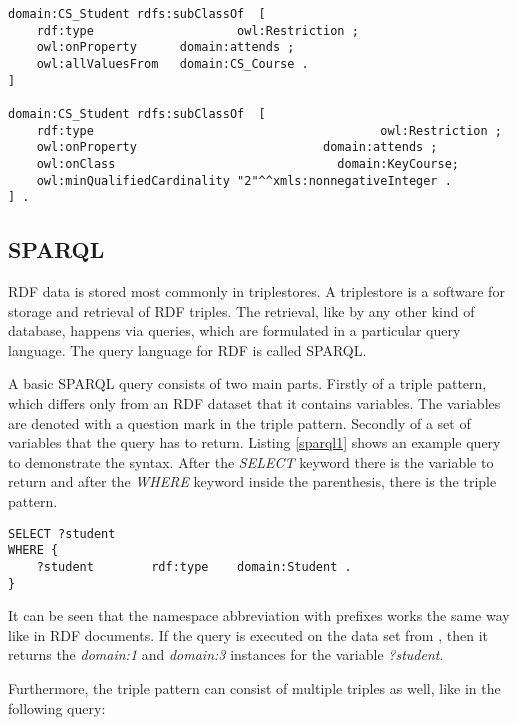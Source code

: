 \begin{lstlisting}[basicstyle=\footnotesize, captionpos=b, caption=Blank nodes in N3, label=lst:sparql, belowskip=1em, aboveskip=2em,
frame=single]
domain:CS_Student rdfs:subClassOf  [ 
	rdf:type					owl:Restriction ; 
	owl:onProperty		domain:attends ; 
	owl:allValuesFrom	domain:CS_Course .
]

domain:CS_Student rdfs:subClassOf  [
	rdf:type										owl:Restriction ; 
	owl:onProperty							domain:attends ; 
	owl:onClass								  domain:KeyCourse; 
	owl:minQualifiedCardinality "2"^^xmls:nonnegativeInteger .
] .
\end{lstlisting}


\subsection{SPARQL}

RDF data is stored most commonly in triplestores. A triplestore is a software for storage and retrieval of RDF triples. The retrieval, like by any other kind of database, happens via queries, which are formulated in a particular query language. The query language for RDF is called SPARQL. 

A basic SPARQL query consists of two main parts. Firstly of a triple pattern, which differs only from an RDF dataset that it contains variables. The variables are denoted with a question mark in the triple pattern. Secondly of a set of variables that the query has to return. Listing \ref{sparql1} shows an example query to demonstrate the syntax. After the \textit{SELECT} keyword there is the variable to return and after the \textit{WHERE} keyword inside the parenthesis, there is the triple pattern.

\begin{lstlisting}[captionpos=b, caption=SPARQL Query I., label=sparql1, belowskip=1em, aboveskip=2em, 
basicstyle=\footnotesize,frame=single]
SELECT ?student  
WHERE { 
	?student		rdf:type	domain:Student .	
}
\end{lstlisting}

It can be seen that the namespace abbreviation with prefixes works the same way like in RDF documents. If the query is executed on the data set from , then it returns the \textit{domain:1} and \textit{domain:3} instances for the variable \textit{?student}. 


Furthermore, the triple pattern can consist of  multiple triples as well, like in the following query:


